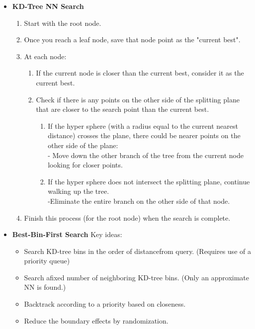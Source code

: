 \documentclass{../cheat}
\begin{document}
\begin{multicols}{3}
\begin{itemize}[nolistsep, leftmargin=1em]
		\item \textbf{KD-Tree NN Search}
		\begin{enumerate}
			\item Start with the root node.
			\item Once you reach a leaf node, save that node point as the "current best".
			\item At each node:
				\begin{enumerate}[label=\roman*, nolistsep, leftmargin=1em]
					\item If the current node is closer than the current best, consider it as the current best.
					\item Check if there is any points on the other side of the splitting plane that are closer to the search point than the current best.
					\begin{enumerate}[label=\alph*, nolistsep, leftmargin=1em]
						\item If the hyper sphere (with a radius equal to the current nearest distance) crosses the plane, there could be nearer points on the other side of the plane:
						\\- Move down the other branch of the tree from the current node looking for closer points.
						\item If the hyper sphere does not intersect the splitting plane, continue walking up the tree.
						\\-Eliminate the entire branch on the other side of that node.
					\end{enumerate}
				\end{enumerate}
			\item Finish this process (for the root node) when the search is complete.
		\end{enumerate}
		
		\item \textbf{Best-Bin-First Search}
		Key ideas:
		\begin{itemize}
			\item Search KD-tree bins in the order of distancefrom query.
				(Requires use of a priority queue)
			\item Search afixed number of neighboring KD-tree bins.
				(Only an approximate NN is found.)
			\item Backtrack according to a priority based on closeness.
			\item Reduce the boundary effects by randomization.	
		\end{itemize}
	\end{itemize}


\end{multicols}
\end{document}

